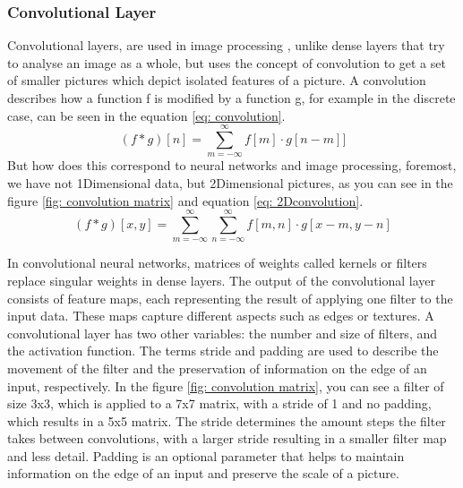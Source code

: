 \subsubsection{Convolutional Layer}
Convolutional layers, are used in image processing \cite{lecun_backpropagation_1989,szegedy_going_2014,krizhevsky_imagenet_2012}, unlike dense layers that try to analyse an image as a whole, but uses the concept of convolution to get a set of smaller pictures which depict isolated features of a picture.
A convolution describes how a function f is modified by a function g, for example in the discrete case, can be seen in the equation \ref{eq: convolution}.
\begin{equation}
(f \ast g)[n]
    = \sum_{m=-\infty}^{\infty}f[m]\cdot g[n - m]
    \label{eq: convolution}]
\end{equation}
But how does this correspond to neural networks and image processing, foremost, we have not 1Dimensional data, but 2Dimensional pictures, as you can see in the figure \ref{fig: convolution matrix} and equation \ref{eq: 2Dconvolution}.
\begin{equation}
(f \ast g)[x,y]
    = \sum^{\infty}_{m=-\infty} \sum^{\infty}_{n=-\infty} f[m,n]\cdot g[x-m,y-n]
    \label{eq: 2Dconvolution}
\end{equation}

In convolutional neural networks, matrices of weights called kernels or filters replace singular weights in dense layers.
The output of the convolutional layer consists of feature maps, each representing the result of applying one filter to the input data.
These maps capture different aspects such as edges or textures.
A convolutional layer has two other variables: the number and size of filters, and the activation function.
The terms stride and padding are used to describe the movement of the filter and the preservation of information on the edge of an input, respectively.
In the figure \ref{fig: convolution matrix}, you can see a filter of size 3x3, which is applied to a 7x7 matrix, with a stride of 1 and no padding, which results in a 5x5 matrix.
The stride determines the amount steps the filter takes between convolutions, with a larger stride resulting in a smaller filter map and less detail.
Padding is an optional parameter that helps to maintain information on the edge of an input and preserve the scale of a picture.

